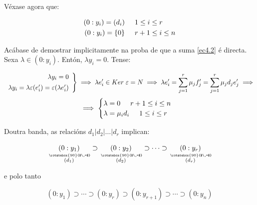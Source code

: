 \documentclass[twoside]{report}
\newcommand{\verteq}{\rotatebox{90}{$\,=$}}
\newcommand{\equalto}[2]{\underset{\scriptstyle\overset{\mkern4mu\verteq}{#2}}{#1}}
\theoremstyle{mystyle}
\begin{document}
\noindent Véxase agora que:

$$
\begin{aligned}
    (0:y_{i}) = (d_{i}) & \hspace{5mm} 1 \leq i \leq r\\
    (0 : y_{i}) = \{0\} & \hspace{5mm} r + 1 \leq i \leq n
\end{aligned}
$$

\vspace{3mm}

\noindent {} Acábase de demostrar implicitamente na proba de que a suma \eqref{ec4.2} é directa.\\

\noindent {} Sexa $\lambda \in (0:y_{i})$. Entón, $\lambda y_{i} = 0$. Tense:

            \[ 
            \left. \begin{array}{r} 
            \lambda y_{i} = 0\\[1ex]
            \lambda y_{i} = \lambda \varepsilon(e'_{i}) = \varepsilon(\lambda e'_{i})
            \end{array} \right\}
            \implies \lambda e'_{i} \in Ker \hspace{1mm} \varepsilon = N \implies \lambda e'_{i} = \displaystyle \sum_{j = 1}^{r}\mu_{j}f'_{j} = \sum_{j = 1}^{r}\mu_{j}d_{j}e'_{j} \implies
            \]  
            $$
            \implies 
            \begin{cases}
            \lambda = 0 \hspace{5mm} r+1 \leq i \leq n\\
            \lambda = \mu_{i}d_{i} \hspace{5mm} 1 \leq i \leq r
            \end{cases}
            $$
            
\pagebreak
            
\noindent Doutra banda, as relacións $d_{1} | d_{2} | \dots | d_{r}$ implican: 

$$\equalto{(0 : y_{1})}{(d_{1})} \supset \equalto{(0:y_{2})}{(d_{2})} \supset \cdots \supset \equalto{(0:y_{r})}{(d_{r})}$$

\noindent e polo tanto

$$(0 : y_{1}) \supset \cdots \supset (0 : y_{r}) \supset (0 : y_{r+1}) \supset \cdots \supset (0 : y_{n})$$

\vspace{3mm}
\end{document}
